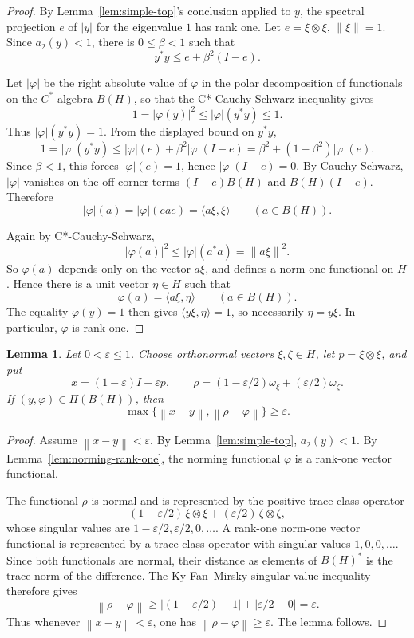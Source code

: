 \documentclass[11pt]{article}
\newtheorem{lemma}{Lemma}
\newcommand{\norm}[1]{\left\lVert #1 \right\rVert}
\newcommand{\eps}{\varepsilon}
\begin{document}
\begin{proof}
By Lemma~\ref{lem:simple-top}'s conclusion applied to \(y\), the spectral
projection \(e\) of \(|y|\) for the eigenvalue \(1\) has rank one. Let
\(e=\xi\otimes\xi\), \(\norm{\xi}=1\). Since \(a_2(y)<1\), there is
\(0\leq \beta<1\) such that
\[
  y^*y\leq e+\beta^2(I-e).
\]

Let \(|\varphi|\) be the right absolute value of \(\varphi\) in the polar
decomposition of functionals on the \(C^*\)-algebra \(B(H)\), so that the
C*-Cauchy-Schwarz inequality gives
\[
  1=|\varphi(y)|^2\leq |\varphi|(y^*y)\leq 1.
\]
Thus \(|\varphi|(y^*y)=1\). From the displayed bound on \(y^*y\),
\[
  1=|\varphi|(y^*y)\leq |\varphi|(e)+\beta^2|\varphi|(I-e)
  =\beta^2+(1-\beta^2)|\varphi|(e).
\]
Since \(\beta<1\), this forces \(|\varphi|(e)=1\), hence
\(|\varphi|(I-e)=0\). By Cauchy-Schwarz, \(|\varphi|\) vanishes on the
off-corner terms \((I-e)B(H)\) and \(B(H)(I-e)\). Therefore
\[
  |\varphi|(a)=|\varphi|(eae)=\langle a\xi,\xi\rangle
  \qquad(a\in B(H)).
\]

Again by C*-Cauchy-Schwarz,
\[
  |\varphi(a)|^2\leq |\varphi|(a^*a)=\norm{a\xi}^2 .
\]
So \(\varphi(a)\) depends only on the vector \(a\xi\), and defines a
norm-one functional on \(H\). Hence there is a unit vector \(\eta\in H\)
such that
\[
  \varphi(a)=\langle a\xi,\eta\rangle
  \qquad(a\in B(H)).
\]
The equality \(\varphi(y)=1\) then gives
\(\langle y\xi,\eta\rangle=1\), so necessarily \(\eta=y\xi\). In particular,
\(\varphi\) is rank one.
\end{proof}

\begin{lemma}\label{lem:bad-pair}
Let \(0<\eps\le1\). Choose orthonormal vectors \(\xi,\zeta\in H\), let
\(p=\xi\otimes\xi\), and put
\[
  x=(1-\eps)I+\eps p,\qquad
  \rho=(1-\eps/2)\omega_\xi+(\eps/2)\omega_\zeta .
\]
If \((y,\varphi)\in\Pi(B(H))\), then
\[
  \max\{\norm{x-y},\norm{\rho-\varphi}\}\geq\eps .
\]
\end{lemma}

\begin{proof}
Assume \(\norm{x-y}<\eps\). By Lemma~\ref{lem:simple-top}, \(a_2(y)<1\).
By Lemma~\ref{lem:norming-rank-one}, the norming functional \(\varphi\) is
a rank-one vector functional.

The functional \(\rho\) is normal and is represented by the positive
trace-class operator
\[
  (1-\eps/2)\,\xi\otimes\xi+(\eps/2)\,\zeta\otimes\zeta,
\]
whose singular values are \(1-\eps/2,\eps/2,0,\ldots\). A rank-one
norm-one vector functional is represented by a trace-class operator with
singular values \(1,0,0,\ldots\). Since both functionals are normal, their
distance as elements of \(B(H)^*\) is the trace norm of the difference.
The Ky Fan--Mirsky singular-value inequality therefore gives
\[
  \norm{\rho-\varphi}
  \geq \left|(1-\eps/2)-1\right|+\left|\eps/2-0\right|
  =\eps .
\]
Thus whenever \(\norm{x-y}<\eps\), one has
\(\norm{\rho-\varphi}\geq\eps\). The lemma follows.
\end{proof}
\end{document}
